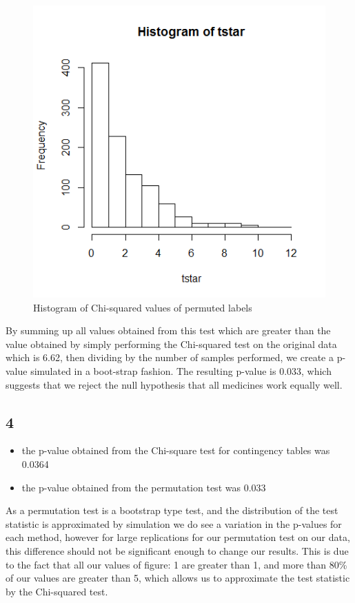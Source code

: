 \documentclass{article}
\begin{document}
    \begin{figure}[H]
          \centering
          \includegraphics[scale=0.6]{../results/1_3.png}
          \caption{Histogram of Chi-squared values of permuted labels}
          \label{fig:Htgrm}
      \end{figure} 
    
By summing up all values obtained from this test which are greater than the value obtained by simply performing the Chi-squared test on the original data which is 6.62, then dividing by the number of samples performed, we create a p-value simulated in a boot-strap fashion. The resulting p-value is 0.033, which suggests that we reject the null hypothesis that all medicines work equally well.
    
    \subsection*{4}
    \begin{itemize}
    \item the p-value obtained from the Chi-square test for contingency tables was 0.0364
    \item the p-value obtained from the permutation test was 0.033
    \end{itemize}
    As a permutation test is a bootstrap type test, and the distribution of the test statistic is approximated by simulation we do see a variation in the p-values for each method, however for large replications for our permutation test on our data, this difference should not be significant enough to change our results. This is due to the fact that all our values of figure: 1 are greater than 1, and more than 80\% of our values are greater than 5, which allows us to approximate the test statistic by the Chi-squared test.
\end{document}
